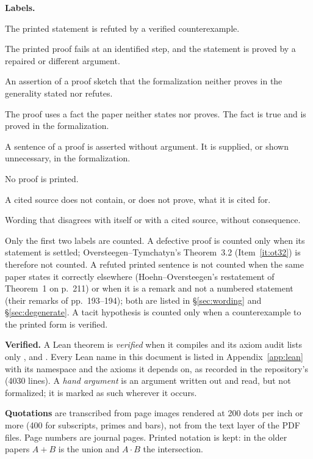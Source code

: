 \documentclass[11pt]{article}
\newcounter{defect}
\begin{document}
\textbf{Labels.}
\begin{description}[leftmargin=1.5em,style=nextline]
\item[False as printed] The printed statement is refuted by a verified counterexample.
\item[Proof defective; statement true] The printed proof fails at an identified step, and the
  statement is proved by a repaired or different argument.
\item[Not established] An assertion of a proof sketch that the formalization neither proves in the
  generality stated nor refutes.
\item[Unstated step] The proof uses a fact the paper neither states nor proves. The fact is true
  and is proved in the formalization.
\item[Unargued] A sentence of a proof is asserted without argument. It is supplied, or shown
  unnecessary, in the formalization.
\item[Stated without proof] No proof is printed.
\item[Citation] A cited source does not contain, or does not prove, what it is cited for.
\item[Harmless] Wording that disagrees with itself or with a cited source, without consequence.
\end{description}
Only the first two labels are counted. A defective proof is counted only when its statement is
settled; Oversteegen--Tymchatyn's Theorem~3.2 (Item~\ref{it:ot32}) is therefore not counted. A
refuted printed sentence is not counted when the same paper states it correctly elsewhere
(Hoehn--Oversteegen's restatement of Theorem~1 on p.~211) or when it is a remark and not a
numbered statement (their remarks of pp.~193--194); both are listed in \S\ref{sec:wording} and
\S\ref{sec:degenerate}. A tacit hypothesis is counted only when a counterexample to the printed
form is verified.

\textbf{Verified.} A Lean theorem is \emph{verified} when it compiles and its axiom audit lists
only ,  and . Every Lean name in this
document is listed in Appendix~\ref{app:lean} with its namespace and the axioms it depends on, as
recorded in the repository's  (4030 lines). A \emph{hand argument} is an argument
written out and read, but not formalized; it is marked as such wherever it occurs.

\textbf{Quotations} are transcribed from page images rendered at 200 dots per inch or more
(400 for subscripts, primes and bars), not from the text layer of the PDF files. Page numbers are
journal pages. Printed notation is kept: in the older papers $A+B$ is the union and $A\cdot B$ the
intersection.
\end{document}
